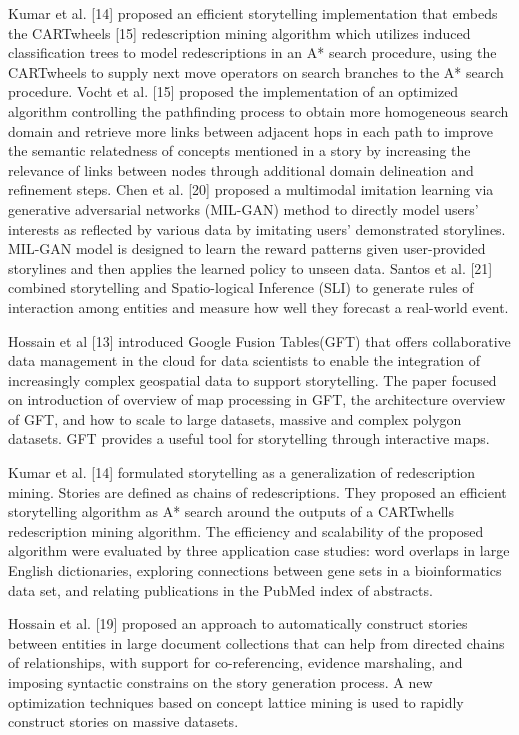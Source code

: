 \documentclass[conference]{IEEEtran}
\begin{document}
Kumar et al. [14] proposed an efficient storytelling implementation that embeds the CARTwheels [15] redescription mining algorithm which utilizes induced classification trees to model redescriptions in an A* search procedure, using the CARTwheels to supply next move operators on search branches to the A* search procedure. Vocht et al. [15] proposed the implementation of an optimized algorithm controlling the pathfinding process to obtain more homogeneous search domain and retrieve more links between adjacent hops in each path to improve the semantic relatedness of concepts mentioned in a story by increasing the relevance of links between nodes through additional domain delineation and refinement steps. Chen et al. [20] proposed a multimodal imitation learning via generative adversarial networks (MIL-GAN) method to directly model users' interests as reflected by various data by imitating users' demonstrated storylines. MIL-GAN model is designed to learn the reward patterns given user-provided storylines and then applies the learned policy to unseen data. Santos et al. [21] combined storytelling and Spatio-logical Inference (SLI) to generate rules of interaction among entities and measure how well they forecast a real-world event. 



Hossain et al [13] introduced Google Fusion Tables(GFT) that offers collaborative data management in the cloud for data scientists to enable the integration of increasingly complex geospatial data to support storytelling. The paper focused on introduction of overview of map processing in GFT, the architecture overview of GFT, and how to scale to large datasets, massive and complex polygon datasets. GFT provides a useful tool for storytelling through interactive maps. 



Kumar et al. [14] formulated storytelling as a generalization of redescription mining. Stories are defined as chains of redescriptions. They proposed an efficient storytelling algorithm as A* search around the outputs of a CARTwhells redescription mining algorithm. The efficiency and scalability of the proposed algorithm were evaluated by three application case studies: word overlaps in large English dictionaries, exploring connections between gene sets in a bioinformatics data set, and relating publications in the PubMed index of abstracts. 



Hossain et al. [19] proposed an approach to automatically construct stories between entities in large document collections that can help from directed chains of relationships, with support for co-referencing, evidence marshaling, and imposing syntactic constrains on the story generation process. A new optimization techniques based on concept lattice mining is used to rapidly construct stories on massive datasets. 
\end{document}
